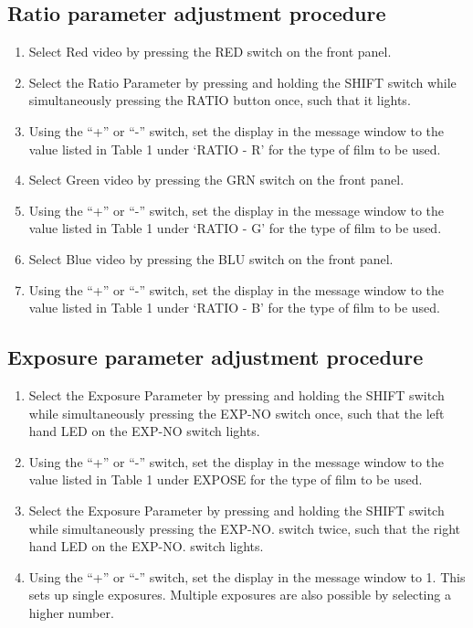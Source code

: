 \subsection {\bf Ratio parameter adjustment procedure}

\begin {enumerate}

\item Select Red video by pressing the RED switch on the front panel.

\item Select the Ratio Parameter by pressing and holding the SHIFT switch
while simultaneously pressing the RATIO button once, such that it
lights.

\item Using the ``+'' or ``-'' switch, set the display in the message window to
the value listed in Table 1 under `RATIO - R' for the type of film
to be used.

\item Select Green video by pressing the GRN switch on the front panel.

\item Using the ``+'' or ``-'' switch, set the display in the message window
to the value listed in Table 1 under `RATIO - G' for the type
of film to be used.

\item Select Blue video by pressing the BLU switch on the front panel.

\item Using the ``+'' or ``-'' switch, set the display in the message window to
the value listed in Table 1 under `RATIO - B' for the type of film
to be used.

\end{enumerate}

\subsection {\bf Exposure parameter adjustment procedure}

\begin{enumerate}

\item Select the Exposure Parameter by pressing and holding the SHIFT switch
while simultaneously pressing the EXP-NO switch once, such that the
left hand LED on the EXP-NO switch lights.

\item Using the ``+'' or ``-'' switch, set the display in the message window to
the value listed in Table 1 under EXPOSE for the type of film to be
used.

\item Select the Exposure Parameter by pressing and holding the SHIFT switch
while simultaneously pressing the EXP-NO. switch twice, such that the
right hand LED on the EXP-NO. switch lights.

\item Using the ``+'' or ``-'' switch, set the display in the message window to
1. This sets up single exposures. Multiple exposures are also possible by
selecting a higher number.

\end{enumerate}


